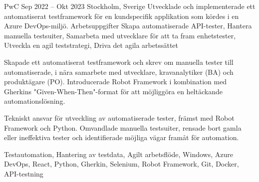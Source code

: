 \documentclass{sobCV}[2015/09/08]
\begin{document}
   {PwC}
    {Sep 2022 -- Okt 2023}
   {Stockholm, Sverige}{
       Utvecklade och implementerade ett automatiserat testframework för en kundspecifik applikation som kördes i en Azure DevOps-miljö.
   }
   {Arbetsuppgifter}{
       Skapa automatiserade API-tester, 
       Hantera manuella testsuiter,
       Samarbeta med utvecklare för att ta fram enhetstester,
       Utveckla en agil teststrategi,
       Driva det agila arbetssättet
 }{
      {
         Skapade ett automatiserat testframework och skrev om manuella tester till automatiserade, i nära samarbete med utvecklare, kravanalytiker (BA) och produktägare (PO). Introducerade Robot Framework i kombination med Gherkins "Given-When-Then"-format för att möjliggöra en heltäckande automationslösning.

         Tekniskt ansvar för utveckling av automatiserade tester, främst med Robot Framework och Python. Omvandlade manuella testsuiter, rensade bort gamla eller ineffektiva tester och identifierade möjliga vägar framåt för automation.
     }
 }{
       Testautomation,
       Hantering av testdata,
       Agilt arbetsflöde, 
       Windows, 
       Azure DevOps, 
       React, 
       Python, 
       Gherkin, 
       Selenium, 
       Robot Framework,
       Git, 
       Docker, 
       API-testning 
}
\end{document}
